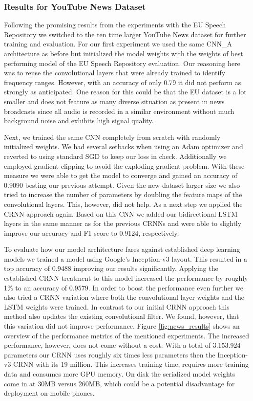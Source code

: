 \subsubsection{Results for YouTube News Dataset}
\label{sec:results_news}
Following the promising results from the experiments with the EU Speech Repository we switched to the ten time larger YouTube News dataset for further training and evaluation.
For our first experiment we used the same CNN\_A architecture as before but initialized the model weights with the weights of best performing model of the EU Speech Repository evaluation. Our reasoning here was to reuse the convolutional layers that were already trained to identify frequency ranges. However, with an accuracy of only 0.79 it did not perform as strongly as anticipated. One reason for this could be that the EU dataset is a lot smaller and does not feature as many diverse situation as present in news broadcasts since all audio is recorded in a similar environment without much background noise and exhibits high signal quality.

Next, we trained the same CNN completely from scratch with randomly initialized weights. We had several setbacks when using an Adam optimizer and reverted to using standard SGD to keep our loss in check. Additionally we employed gradient clipping to avoid the exploding gradient problem. With these measure we were able to get the model to converge and gained an accuracy of 0.9090 besting our previous attempt. 
Given the new dataset larger size we also tried to increase the number of parameters by doubling the feature maps of the convolutional layers. This, however, did not help.
As a next step we applied the CRNN approach again. Based on this CNN we added our bidirectional LSTM layers in the same manner as for the previous CRNNs and were able to slightly improve our accuracy and F1 score to 0.9124, respectively. 

To evaluate how our model architecture fares against established deep learning models we trained a model using Google's Inception-v3\cite{szegedy2016rethinking} layout. This resulted in a top accuracy of 0.9488 improving our results significantly. Applying the established CRNN treatment to this model increased the performance by roughly 1\% to an accuracy of 0.9579. In order to boost the performance even further we also tried a CRNN variation where both the convolutional layer weights and the LSTM weights were trained. In contrast to our initial CRNN approach this method also updates the existing convolutional filter. We found, however, that this variation did not improve performance.
Figure \ref{fig:news_results} shows an overview of the performance metrics of the mentioned experiments.
The increased performance, however, does not come without a cost. With a total of 3.153.924 parameters our CRNN uses roughly six times less parameters then the Inception-v3 CRNN with its 19 million. This increases training time, requires more training data and consumes more GPU memory. On disk the serialized model weights come in at 30MB versus 260MB, which could be a potential disadvantage for deployment on mobile phones.

